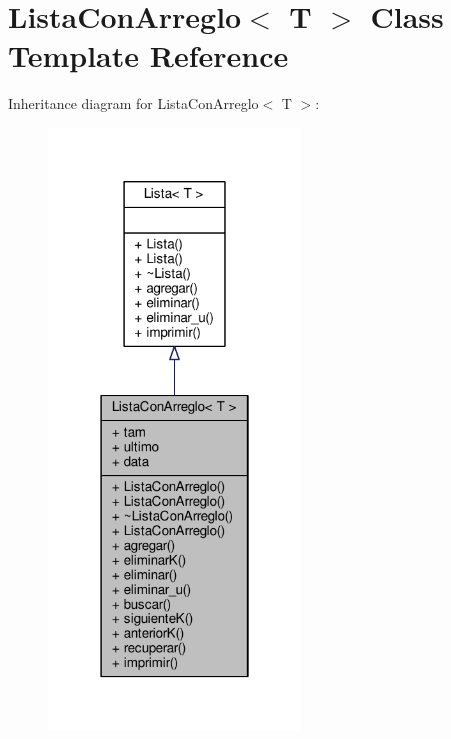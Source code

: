 \hypertarget{class_lista_con_arreglo}{\section{Lista\+Con\+Arreglo$<$ T $>$ Class Template Reference}
\label{class_lista_con_arreglo}
}


Inheritance diagram for Lista\+Con\+Arreglo$<$ T $>$\+:
\nopagebreak
\begin{figure}[H]
\begin{center}
\leavevmode
\includegraphics[width=190pt]{class_lista_con_arreglo__inherit__graph}
\end{center}
\end{figure}


